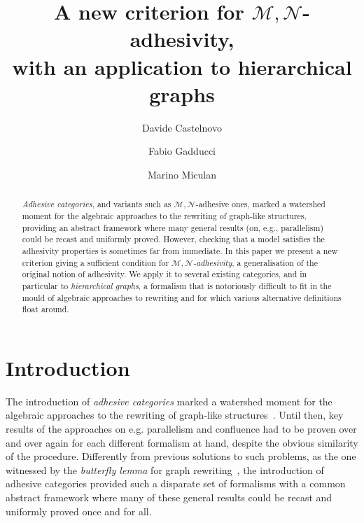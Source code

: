 \documentclass[runningheads,envcountsect]{lmcs}
\title{A new criterion for $\mathcal{M}, \mathcal{N}$-adhesivity,\\ with an application to hierarchical graphs\rsuper*}
\author[D.~Castelnovo]{Davide Castelnovo}	%
\author[F.~Gadducci]{Fabio Gadducci}	%
\author[M.~Miculan]{Marino Miculan}	%
\theoremstyle{plain}
\theoremstyle{definition}
\begin{document}
\begin{abstract}
\emph{Adhesive categories}, and variants such as $\mathcal{M}, \mathcal{N}$-adhesive ones,  
marked a watershed moment for the algebraic approaches to the rewriting of graph-like structures, providing an abstract framework where many general results (on, e.g., parallelism)  could be recast and uniformly proved.
%
However, checking that a model satisfies the adhesivity properties is sometimes far from immediate.
In this paper we present a new criterion giving a sufficient condition for \emph{$\mathcal{M}, \mathcal{N}$-adhesivity}, a generalisation of the original notion of adhesivity.
We apply it to several existing categories, and in particular to \emph{hierarchical graphs}, a formalism that is notoriously difficult to fit in the mould of algebraic approaches to rewriting and for which various alternative definitions float around.
\end{abstract}
\maketitle
\section{Introduction}
The introduction of \emph{adhesive categories} marked a watershed moment for the algebraic approaches 
to the rewriting of graph-like structures~\cite{lack2005adhesive,ehrig2006fundamentals}.
%
Until then, key results of the approaches on e.g. parallelism and confluence had to be proven 
over and over again for each different formalism at hand, %
despite the obvious similarity of the procedure.
%
Differently from previous solutions to such problems, as the one witnessed by the \emph{butterfly lemma} for 
graph rewriting~\cite[Lemma~3.9.1]{CorradiniMREHL97},
the introduction of adhesive categories provided such a disparate set of formalisms with a common abstract framework 
where many of these general results could be recast and uniformly proved once and for all.
%
\end{document}
